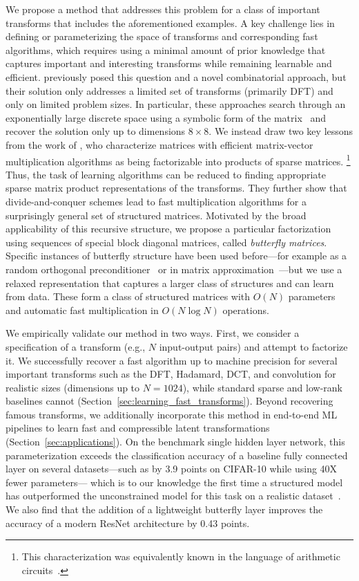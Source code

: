 We propose a method that addresses this problem for a class of important transforms that includes the aforementioned examples. A key challenge lies in defining or parameterizing the space of transforms and corresponding fast algorithms, which requires using a minimal amount of prior knowledge that captures important and interesting transforms while remaining learnable and efficient.
\citet{egner2001automatic,egner2004symmetry} previously posed this question and a novel combinatorial approach, but their solution only addresses a limited set of transforms (primarily DFT) and only on limited problem sizes. In particular, these approaches search through an exponentially large discrete space using a symbolic form of the matrix~\cite{egner2001automatic,egner2004symmetry} and recover the solution only up to dimensions $8 \times 8$. We instead draw two key lessons from the work of \citet{desa2018two},
who characterize matrices with efficient matrix-vector multiplication algorithms as being factorizable into products of sparse matrices.
\footnote{This characterization was equivalently known in the language of arithmetic circuits~\citep{burgisser2013algebraic}.} Thus, the task of learning algorithms can be reduced to finding appropriate sparse matrix product representations of the transforms. They further show that divide-and-conquer schemes lead to fast multiplication algorithms for a surprisingly general set of structured matrices. Motivated by the broad applicability of this recursive structure, we propose a particular factorization using sequences of special block diagonal matrices, called \emph{butterfly matrices}. Specific instances of butterfly structure have been used before---for example as a random orthogonal preconditioner~\citep{parker1995random} or in matrix approximation~\citep{li2015butterfly}---but we use a relaxed representation that captures a larger class of structures and can learn from data. These form a class of structured matrices with $O(N)$ parameters and automatic fast multiplication in $O(N \log N)$ operations.

We empirically validate our method in two ways. First, we consider a specification of a transform (e.g., $N$ input-output pairs) and attempt to factorize it. We successfully recover a fast algorithm up to machine precision for several important transforms such as the DFT, Hadamard, DCT, and convolution for realistic sizes (dimensions up to $N=1024$), while standard sparse and low-rank baselines cannot (Section~\ref{sec:learning_fast_transforms}).
Beyond recovering famous transforms, we additionally incorporate this method in end-to-end ML pipelines to learn fast and compressible latent transformations (Section~\ref{sec:applications}). 
On the benchmark single hidden layer network, this parameterization exceeds the classification accuracy of a baseline fully connected layer on several datasets---such as by 3.9 points on CIFAR-10 while using 40X fewer parameters--- which is to our knowledge the first time a structured model has outperformed the unconstrained model for this task on a realistic dataset~\citep{thomas2018learning}. We also find that the addition of a lightweight butterfly layer improves the accuracy of a modern ResNet architecture by 0.43 points.

